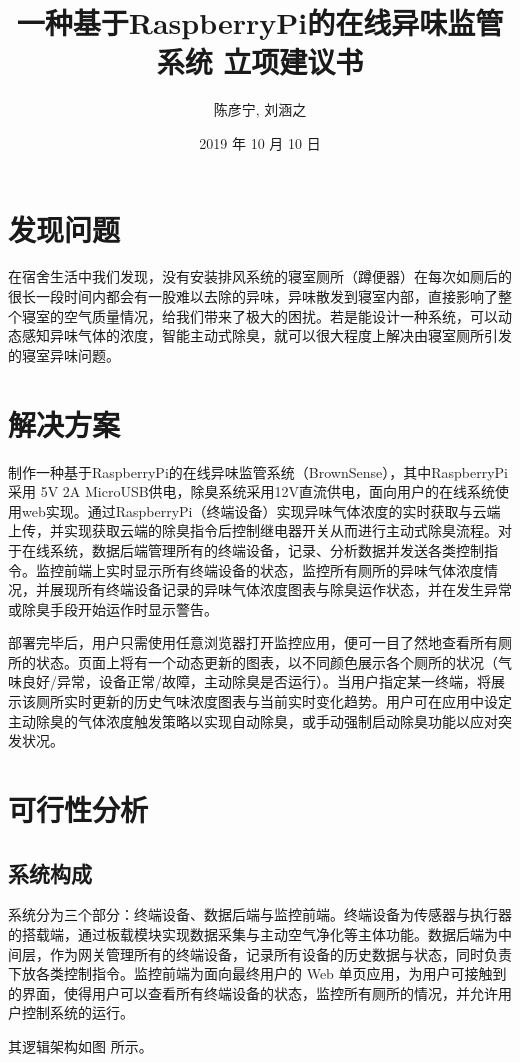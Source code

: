 \documentclass[UTF8]{ctexart}
\title{一种基于RaspberryPi的在线异味监管系统 立项建议书}
\author{陈彦宁, 刘涵之}
\date{2019 年 10 月 10 日}
\begin{document}
\maketitle
\pagebreak
\tableofcontents
\pagebreak
\section{发现问题}
在宿舍生活中我们发现，没有安装排风系统的寝室厕所（蹲便器）在每次如厕后的很长一段时间内都会有一股难以去除的异味，异味散发到寝室内部，直接影响了整个寝室的空气质量情况，给我们带来了极大的困扰。若是能设计一种系统，可以动态感知异味气体的浓度，智能主动式除臭，就可以很大程度上解决由寝室厕所引发的寝室异味问题。
\section{解决方案}
制作一种基于RaspberryPi的在线异味监管系统（BrownSense），其中RaspberryPi采用 5V 2A MicroUSB供电，除臭系统采用12V直流供电，面向用户的在线系统使用web实现。通过RaspberryPi（终端设备）实现异味气体浓度的实时获取与云端上传，并实现获取云端的除臭指令后控制继电器开关从而进行主动式除臭流程。对于在线系统，数据后端管理所有的终端设备，记录、分析数据并发送各类控制指令。监控前端上实时显示所有终端设备的状态，监控所有厕所的异味气体浓度情况，并展现所有终端设备记录的异味气体浓度图表与除臭运作状态，并在发生异常或除臭手段开始运作时显示警告。

部署完毕后，用户只需使用任意浏览器打开监控应用，便可一目了然地查看所有厕所的状态。页面上将有一个动态更新的图表，以不同颜色展示各个厕所的状况（气味良好/异常，设备正常/故障，主动除臭是否运行）。当用户指定某一终端，将展示该厕所实时更新的历史气味浓度图表与当前实时变化趋势。用户可在应用中设定主动除臭的气体浓度触发策略以实现自动除臭，或手动强制启动除臭功能以应对突发状况。
\section{可行性分析}
\subsection{系统构成}
系统分为三个部分：终端设备、数据后端与监控前端。终端设备为传感器与执行器的搭载端，通过板载模块实现数据采集与主动空气净化等主体功能。数据后端为中间层，作为网关管理所有的终端设备，记录所有设备的历史数据与状态，同时负责下放各类控制指令。监控前端为面向最终用户的 Web 单页应用，为用户可接触到的界面，使得用户可以查看所有终端设备的状态，监控所有厕所的情况，并允许用户控制系统的运行。

其逻辑架构如图 所示。
\end{document}
